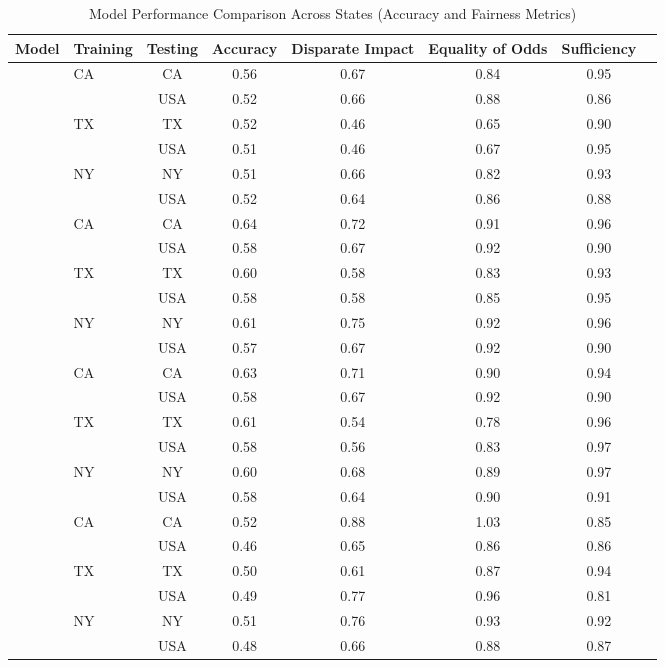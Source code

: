 \begin{table}[h]
\centering
\caption{Model Performance Comparison Across States (Accuracy and Fairness Metrics)}
\label{tab:folktables-results}
\resizebox{\textwidth}{!}
{
\begin{tabular}{llcccccc}
\toprule
\textbf{Model} & \textbf{Training} & \textbf{Testing} & \textbf{Accuracy} & \textbf{Disparate Impact} & \textbf{Equality of Odds} & \textbf{Sufficiency} \\
\midrule
\rowcolor{gray!10}
\multirow{6}{*}{Logistic Regression} 
& \multirow{2}{*}{CA} & CA & 0.56 & 0.67 & 0.84 & 0.95 \\
& & USA & 0.52 & 0.66 & 0.88 & 0.86 \\
\cmidrule(lr){2-7}
& \multirow{2}{*}{TX} & TX & 0.52 & 0.46 & 0.65 & 0.90 \\
& & USA & 0.51 & 0.46 & 0.67 & 0.95 \\
\cmidrule(lr){2-7}
& \multirow{2}{*}{NY} & NY & 0.51 & 0.66 & 0.82 & 0.93 \\
& & USA & 0.52 & 0.64 & 0.86 & 0.88 \\
\midrule

\rowcolor{gray!10}
\multirow{6}{*}{XGBoost} 
& \multirow{2}{*}{CA} & CA & 0.64 & 0.72 & 0.91 & 0.96 \\
& & USA & 0.58 & 0.67 & 0.92 & 0.90 \\
\cmidrule(lr){2-7}
& \multirow{2}{*}{TX} & TX & 0.60 & 0.58 & 0.83 & 0.93 \\
& & USA & 0.58 & 0.58 & 0.85 & 0.95 \\
\cmidrule(lr){2-7}
& \multirow{2}{*}{NY} & NY & 0.61 & 0.75 & 0.92 & 0.96 \\
& & USA & 0.57 & 0.67 & 0.92 & 0.90 \\
\midrule

\rowcolor{gray!10}
\multirow{6}{*}{HistGradientBoosting} 
& \multirow{2}{*}{CA} & CA & 0.63 & 0.71 & 0.90 & 0.94 \\
& & USA & 0.58 & 0.67 & 0.92 & 0.90 \\
\cmidrule(lr){2-7}
& \multirow{2}{*}{TX} & TX & 0.61 & 0.54 & 0.78 & 0.96 \\
& & USA & 0.58 & 0.56 & 0.83 & 0.97 \\
\cmidrule(lr){2-7}
& \multirow{2}{*}{NY} & NY & 0.60 & 0.68 & 0.89 & 0.97 \\
& & USA & 0.58 & 0.64 & 0.90 & 0.91 \\
\midrule

\rowcolor{gray!10}
\multirow{6}{*}{Neural Network} 
& \multirow{2}{*}{CA} & CA & 0.52 & 0.88 & 1.03 & 0.85 \\
& & USA & 0.46 & 0.65 & 0.86 & 0.86 \\
\cmidrule(lr){2-7}
& \multirow{2}{*}{TX} & TX & 0.50 & 0.61 & 0.87 & 0.94 \\
& & USA & 0.49 & 0.77 & 0.96 & 0.81 \\
\cmidrule(lr){2-7}
& \multirow{2}{*}{NY} & NY & 0.51 & 0.76 & 0.93 & 0.92 \\
& & USA & 0.48 & 0.66 & 0.88 & 0.87 \\
\bottomrule
\end{tabular}%
}
\end{table}